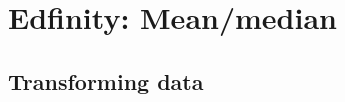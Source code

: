 \documentclass[slidestop,compress,mathserif]{beamer}
\makeatletter
\newcommand{\soln}[1]{\textit{#1}}
\def\chpii@path{../../Chp 2}
\makeatother
\begin{document}







\section{Edfinity: Mean/median}


\subsection{Transforming data}

\end{document}
